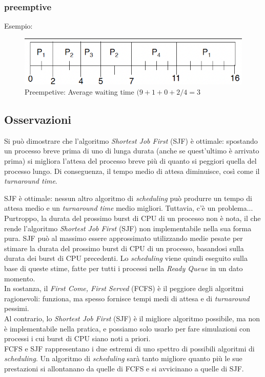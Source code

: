 \subsubsection{preemptive}
Esempio:
\begin{figure}[ht]
    \centering
    \includegraphics[width=0.2\linewidth]{images/SJF_preemptive.png}
    \caption{Preempetive: Average waiting time $(9 + 1 + 0 + 2/4 = 3$}
\end{figure}


\subsection{Osservazioni}
Si può dimostrare che l'algoritmo \textit{Shortest Job First} (SJF) è ottimale: spostando un processo breve prima di uno di lunga durata (anche se quest’ultimo è arrivato prima) si migliora l'attesa del processo breve più di quanto si peggiori quella del processo lungo. Di conseguenza, il tempo medio di attesa diminuisce, così come il \textit{turnaround time}.

SJF è ottimale: nessun altro algoritmo di \textit{scheduling} può produrre un tempo di attesa medio e un \textit{turnaround time} medio migliori. Tuttavia, c'è un problema...\\
Purtroppo, la durata del prossimo burst di CPU di un processo non è nota, il che rende l'algoritmo \textit{Shortest Job First} (SJF) non implementabile nella sua forma pura. SJF può al massimo essere approssimato utilizzando medie pesate per stimare la durata del prossimo burst di CPU di un processo, basandosi sulla durata dei burst di CPU precedenti.
Lo \textit{scheduling} viene quindi eseguito sulla base di queste stime, fatte per tutti i processi nella \textit{Ready Queue} in un dato momento.\\
In sostanza, il \textit{First Come, First Served} (FCFS) è il peggiore degli algoritmi ragionevoli: funziona, ma spesso fornisce tempi medi di attesa e di \textit{turnaround} pessimi.\\

Al contrario, lo \textit{Shortest Job First} (SJF) è il migliore algoritmo possibile, ma non è implementabile nella pratica, e possiamo solo usarlo per fare simulazioni con processi i cui burst di CPU siano noti a priori.\\

FCFS e SJF rappresentano i due estremi di uno spettro di possibili algoritmi di \textit{scheduling}. Un algoritmo di \textit{scheduling} sarà tanto migliore quanto più le sue prestazioni si allontanano da quelle di FCFS e si avvicinano a quelle di SJF.


